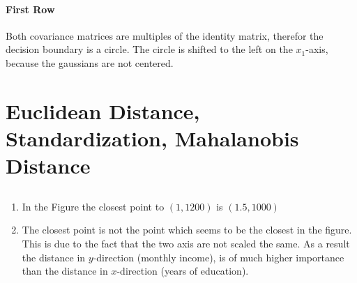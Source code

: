 \documentclass[DIN, pagenumber=false, fontsize=11pt, parskip=half]{scrartcl}
\begin{document}
    \paragraph{First Row}
    Both covariance matrices are multiples of the identity matrix, therefor the decision boundary is a circle. The circle is shifted to the left on the $x_1$-axis,
    because the gaussians are not centered.

    \section{Euclidean Distance, Standardization, Mahalanobis Distance}
    \subsection{}
    \begin{enumerate}[label=\alph*)]
        \item In the Figure the closest point to $(1,1200)$ is $(1.5,1000)$
        \item The closest point is not the point which seems to be the closest in the figure. This is due to the fact that the two axis are not scaled the same. 
            As a result the distance in $y$-direction (monthly income), is of much higher importance than the distance in $x$-direction (years of education).
    \end{enumerate}
\end{document}
